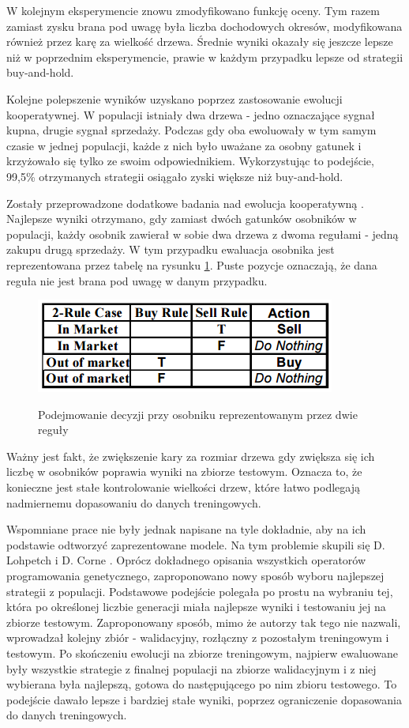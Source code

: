 \documentclass[twoside]{iisthesis}
\begin{document}
W kolejnym eksperymencie znowu zmodyfikowano funkcję oceny. Tym razem zamiast zysku brana pod uwagę była liczba dochodowych okresów, modyfikowana również przez karę za wielkość drzewa. Średnie wyniki okazały się jeszcze lepsze niż w poprzednim eksperymencie, prawie w każdym przypadku lepsze od strategii buy-and-hold.

Kolejne polepszenie wyników uzyskano poprzez zastosowanie ewolucji kooperatywnej. W populacji istniały dwa drzewa - jedno oznaczające sygnał kupna, drugie sygnał sprzedaży. Podczas gdy oba ewoluowały w tym samym czasie w jednej populacji, każde z nich było uważane za osobny gatunek i krzyżowało się tylko ze swoim odpowiednikiem. Wykorzystując to podejście, 99,5\% otrzymanych strategii osiągało zyski większe niż buy-and-hold.

Zostały przeprowadzone dodatkowe badania nad ewolucja kooperatywną \cite{Becker03cooperativecoevolution}. Najlepsze wyniki otrzymano, gdy zamiast dwóch gatunków osobników w populacji, każdy osobnik zawierał w sobie dwa drzewa z dwoma regułami - jedną zakupu drugą sprzedaży. W tym przypadku ewaluacja osobnika jest reprezentowana przez tabelę na rysunku \ref{fig:koewolucja}. Puste pozycje oznaczają, że dana reguła nie jest brana pod uwagę w danym przypadku.

\begin{figure}[h]
\center
\caption {Podejmowanie decyzji przy osobniku reprezentowanym przez dwie reguły}
\includegraphics{koewolucja}
\label{fig:koewolucja}
\end{figure}

Ważny jest fakt, że zwiększenie kary za rozmiar drzewa gdy zwiększa się ich liczbę w osobników poprawia wyniki na zbiorze testowym. Oznacza to, że konieczne jest stałe kontrolowanie wielkości drzew, które łatwo podlegają nadmiernemu dopasowaniu do danych treningowych.

Wspomniane prace nie były jednak napisane na tyle dokładnie, aby na ich podstawie odtworzyć zaprezentowane modele. Na tym problemie skupili się D. Lohpetch i D. Corne \cite{5393324}. Oprócz dokładnego opisania wszystkich operatorów programowania genetycznego, zaproponowano nowy sposób wyboru najlepszej strategii z populacji. Podstawowe podejście polegała po prostu na wybraniu tej, która po określonej liczbie generacji miała najlepsze wyniki i testowaniu jej na zbiorze testowym. Zaproponowany sposób, mimo że autorzy tak tego nie nazwali, wprowadzał kolejny zbiór - walidacyjny, rozłączny z pozostałym treningowym i testowym. Po skończeniu ewolucji na zbiorze treningowym, najpierw ewaluowane były wszystkie strategie z finalnej populacji na zbiorze walidacyjnym i z niej wybierana była najlepszą, gotowa do następującego po nim zbioru testowego. To podejście dawało lepsze i bardziej stałe wyniki, poprzez ograniczenie dopasowania do danych treningowych.
\end{document}
